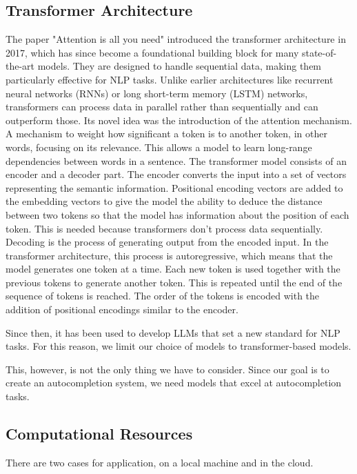 \subsection{Transformer Architecture}
The paper "Attention is all you need" \cite{NIPS2017_3f5ee243}  introduced the transformer architecture in 2017, which has since become a foundational building block for many state-of-the-art models. They are designed to handle sequential data, making them particularly effective for NLP tasks. Unlike earlier architectures like recurrent neural networks (RNNs) or long short-term memory (LSTM) networks, transformers can process data in parallel rather than sequentially and can outperform those.
Its novel idea was the introduction of the attention mechanism. A mechanism to weight how significant a token is to another token, in other words, focusing on its relevance. This allows a model to learn long-range dependencies between words in a sentence. The transformer model consists of an encoder and a decoder part. The encoder converts the input into a set of vectors representing the semantic information. Positional encoding vectors are added to the embedding vectors to give the model the ability to deduce the distance between two tokens so that the model has information about the position of each token. This is needed because transformers don't process data sequentially. 
Decoding is the process of generating output from the encoded input. In the transformer architecture, this process is autoregressive, which means that the model generates one token at a time. Each new token is used together with the previous tokens to generate 
another token. This is repeated until the end of the sequence of tokens is reached.
The order of the tokens is encoded with the addition of positional encodings similar to the encoder.

Since then, it has been used to develop LLMs that set a new standard for NLP tasks.
For this reason, we limit our choice of models to transformer-based models.


This, however, is not the only thing we have to consider. Since our goal is to create an autocompletion system, we need models that excel at autocompletion tasks.


\subsection{Computational Resources}


There are two cases for application, on a local machine and in the cloud.



